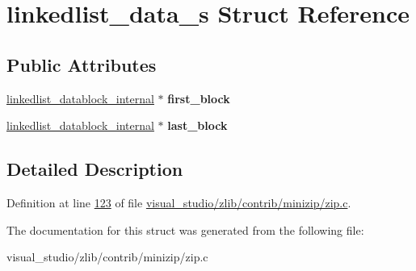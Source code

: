 \hypertarget{structlinkedlist__data__s}{}\section{linkedlist\+\_\+data\+\_\+s Struct Reference}
\label{structlinkedlist__data__s}
\subsection*{Public Attributes}
\begin{DoxyCompactItemize}
\item 
\mbox{\label{structlinkedlist__data__s_af0d06d92f9718aa1e9d25f68d7627fdb}} 
\hyperlink{structlinkedlist__datablock__internal__s}{linkedlist\+\_\+datablock\+\_\+internal} $\ast$ {\bfseries first\+\_\+block}
\item 
\mbox{\label{structlinkedlist__data__s_aab545c28513a9e32491527b020b7705b}} 
\hyperlink{structlinkedlist__datablock__internal__s}{linkedlist\+\_\+datablock\+\_\+internal} $\ast$ {\bfseries last\+\_\+block}
\end{DoxyCompactItemize}


\subsection{Detailed Description}


Definition at line \hyperlink{visual__studio_2zlib_2contrib_2minizip_2zip_8c_source_l00123}{123} of file \hyperlink{visual__studio_2zlib_2contrib_2minizip_2zip_8c_source}{visual\+\_\+studio/zlib/contrib/minizip/zip.\+c}.



The documentation for this struct was generated from the following file\+:\begin{DoxyCompactItemize}
\item 
visual\+\_\+studio/zlib/contrib/minizip/zip.\+c\end{DoxyCompactItemize}
